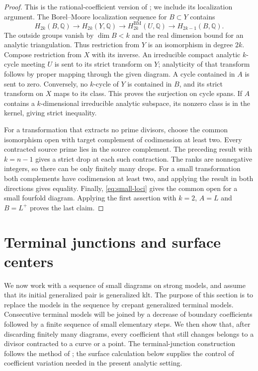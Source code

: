 \documentclass[11pt]{amsart}
\theoremstyle{definition}
\theoremstyle{remark}
\numberwithin{equation}{section}
\newcommand{\Q}{\mathbb{Q}}
\newcommand{\BM}{\mathrm{BM}}
\begin{document}
\begin{proof}
This is the rational-coefficient version of
\cite[Lemma~4.1]{KahlerAuxiliary}; we include its localization argument.
The Borel--Moore localization sequence for $B\subset Y$ contains
\[
 H_{2k}(B,\Q)\longrightarrow H_{2k}(Y,\Q)
 \longrightarrow H_{2k}^{\BM}(U,\Q)
 \longrightarrow H_{2k-1}(B,\Q).
\]
The outside groups vanish by $\dim B<k$ and the real dimension bound
for an analytic triangulation.  Thus restriction from $Y$ is an
isomorphism in degree $2k$.  Compose restriction from $X$ with its
inverse.  An irreducible compact analytic $k$-cycle meeting $U$ is
sent to its strict transform on $Y$; analyticity of that transform
follows by proper mapping through the given diagram.  A cycle
contained in $A$ is sent to zero.  Conversely, no $k$-cycle of $Y$ is
contained in $B$, and its strict transform on $X$ maps to its class.
This proves the surjection on cycle spans.  If $A$ contains a
$k$-dimensional irreducible analytic subspace, its nonzero class is in
the kernel, giving strict inequality.

For a transformation that extracts no prime divisors, choose the
common isomorphism open with target complement of codimension at least
two.  Every contracted source prime lies in the source complement.
The preceding result with $k=n-1$ gives a strict drop at each such
contraction.  The ranks are nonnegative integers, so there can be
only finitely many drops.  For a small transformation both complements
have codimension at least two, and applying the result in both
directions gives equality.  Finally, \eqref{eq:small-loci} gives the
common open for a small fourfold diagram.  Applying the first assertion
with $k=2$, $A=L$ and $B=L^+$ proves the last claim.
\end{proof}

\section{Terminal junctions and surface centers}\label{sec:junctions}

We now work with a sequence of small diagrams on strong models, and
assume that its initial generalized pair is
generalized klt.  The purpose of this section is to replace the models in
the sequence by crepant generalized terminal models.  Consecutive terminal
models will be joined by a decrease of boundary coefficients followed by a
finite sequence of small elementary steps.  We then show that, after
discarding finitely many diagrams, every coefficient that still changes
belongs to a divisor contracted to a curve or a point.  The terminal-junction
construction follows the method of
\cite[Section~3, Proposition~3.4]{ProjectiveLCFourfolds}; the surface
calculation below supplies the control of coefficient variation needed in
the present analytic setting.
\end{document}
